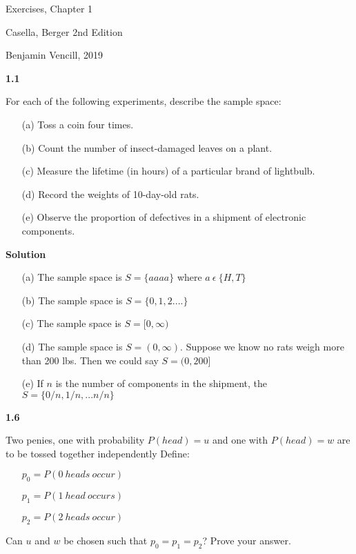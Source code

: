 \documentclass{article}
\begin{document}
\centerline{\sc \large Exercises, Chapter 1}
\centerline{\sc Casella, Berger 2nd Edition}
\centerline{\small Benjamin Vencill, 2019}
\vspace{1pc}


\textbf{1.1} {
For each of the following experiments, describe the sample space:
    \begin{itemize}
        \item[(a)] Toss a coin four times.
        \item[(b)] Count the number of insect-damaged leaves on a plant.
        \item[(c)] Measure the lifetime (in hours) of a particular brand of lightbulb.
        \item[(d)] Record the weights of 10-day-old rats.
        \item[(e)] Observe the proportion of defectives in a shipment of electronic components.
    \end{itemize}
}

\textbf{Solution} {
    \begin{itemize}
        \item[(a)] The sample space is $S = \{aaaa\}$ where $a \ \epsilon \  \{ H, T \}$

        \item[(b)] The sample space is $S = \{0, 1, 2 .... \}$

        \item[(c)] The sample space is $S = [0, \infty)$

        \item[(d)] The sample space is $S =(0, \infty)$. Suppose we know no rats 
                    weigh more than 200 lbs. Then we could say $S = (0, 200]$
        
        \item[(e)] If $n$ is the number of components in the shipment, the $S = \{0/n, 1/n, ... n/n\}$

    \end{itemize}

}





\textbf{1.6} {
Two penies, one with probability $P(head) = u$ and one with $P(head) = w$ are to be tossed
together independently Define:

    \begin{itemize}
        \item[] $p_0 = P(0 \ heads \ occur)$
        \item[] $p_1 = P(1 \ head \ occurs)$
        \item[] $p_2 = P(2 \ heads \ occur)$
    \end{itemize}
Can $u$ and $w$ be chosen such that $p_0 = p_1 = p_2$? Prove your answer.
}
\vspace{1pc}
\end{document}
